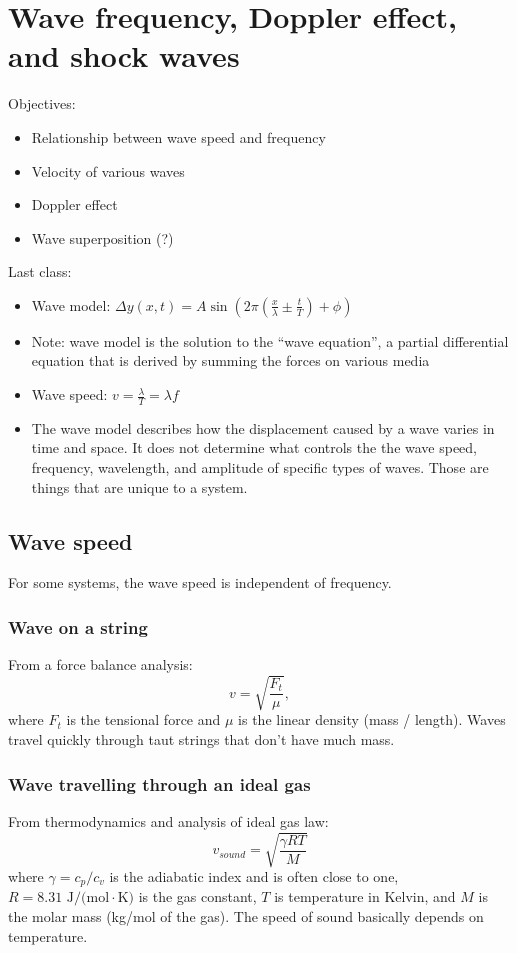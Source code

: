 \section{Wave frequency, Doppler effect, and shock waves}
Objectives:
\begin{itemize}
\item Relationship between wave speed and frequency
\item Velocity of various waves
\item Doppler effect
\item Wave superposition (?)
\end{itemize}

\hrulefill
Last class:
\begin{itemize}
\item Wave model: $\Delta{y}(x,t)=A\sin\left(2\pi\left(\frac{x}{\lambda}\pm\frac{t}{T}\right)+\phi\right)$
\item Note: wave model is the solution to the ``wave equation'', a partial differential equation that is derived by summing the forces on various media
\item Wave speed: $v=\frac{\lambda}{T}=\lambda f$
\item The wave model describes how the displacement caused by a wave varies in time and space. It does not determine what controls the the wave speed, frequency, wavelength, and amplitude of specific types of waves. Those are things that are unique to a system.
\end{itemize}



\subsection{Wave speed}
For some systems, the wave speed is independent of frequency. 

\subsubsection{Wave on a string}
From a force balance analysis:
$$v=\sqrt{\frac{F_t}{\mu}},$$
where $F_t$ is the tensional force and $\mu$ is the linear density (mass / length). Waves travel quickly through taut strings that don't have much mass.

\subsubsection{Wave travelling through an ideal gas}
From thermodynamics and analysis of ideal gas law:
$$v_{sound}=\sqrt{\frac{\gamma RT}{M}}$$
where $\gamma=c_p/c_v$ is the adiabatic index and is often close to one, $R=8.31\mbox{ J/(mol}\cdot\mbox{K)}$ is the gas constant, $T$ is temperature in Kelvin, and $M$ is the molar mass (kg/mol of the gas). The speed of sound basically depends on temperature.

